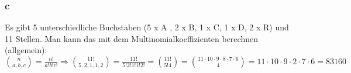 \subsubsection{c} 
Es gibt 5 unterschiedliche Buchstaben (5 x A , 2 x B, 1 x C, 1 x D, 2 x R) und 11 Stellen. Man kann das mit dem Multinomialkoeffizienten berechnen (allgemein): $\binom{n}{a,b,c} = \frac{n!}{a! b! c!} \Rightarrow \binom{11!}{5,2,1,1,2} = \frac{11!}{5! 2! 1! 1! 2!} = \binom{11!}{5! 4} = \binom{11 \cdot  10 \cdot  9 \cdot  8 \cdot  7 \cdot  6}{4} = 11 \cdot  10 \cdot  9 \cdot  2 \cdot  7 \cdot  6 = 83160$
